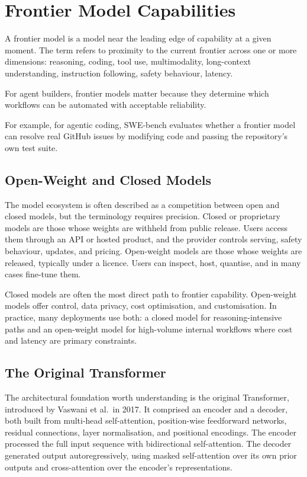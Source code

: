 \chapter{Frontier Model Capabilities}

A frontier model is a model near the leading edge of capability at a given moment. The
term refers to proximity to the current frontier across one or more
dimensions: reasoning, coding, tool use, multimodality, long-context understanding,
instruction following, safety behaviour, latency.

For agent builders, frontier models matter because they determine which workflows can be
automated with acceptable reliability.

For example, for agentic coding, SWE-bench evaluates whether a frontier model can resolve real GitHub issues by modifying code
and passing the repository's own test suite.

\section{Open-Weight and Closed Models}

The model ecosystem is often described as a competition between open and closed models,
but the terminology requires precision. Closed or proprietary models are those whose
weights are withheld from public release. Users access them through an API or hosted
product, and the provider controls serving, safety behaviour, updates, and pricing.
Open-weight models are those whose weights are released, typically under a licence. Users can inspect, host,
quantise, and in many cases fine-tune them.

Closed models are often the most direct
path to frontier capability. Open-weight models offer control, data privacy, cost
optimisation, and customisation. In practice, many deployments use both: a closed model for
reasoning-intensive paths and an open-weight model for high-volume internal workflows
where cost and latency are primary constraints.


\section{The Original Transformer}

The architectural foundation worth understanding is the original Transformer, introduced
by Vaswani et al.\ in 2017. It comprised an encoder and a decoder, both built from
multi-head self-attention, position-wise feedforward networks, residual connections,
layer normalisation, and positional encodings. The encoder processed the full input
sequence with bidirectional self-attention. The decoder generated output
autoregressively, using masked self-attention over its own prior outputs and
cross-attention over the encoder's representations.


